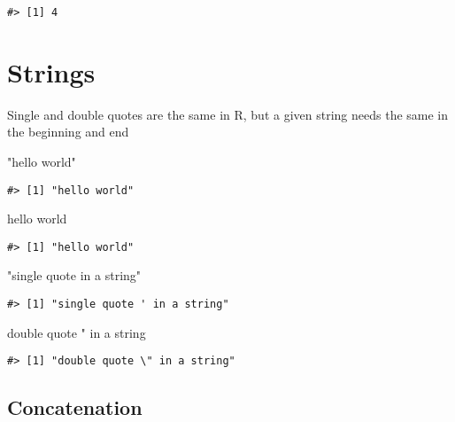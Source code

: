 \documentclass[
]{book}
\newenvironment{Shaded}{\begin{snugshade}}{\end{snugshade}}
\newcommand{\StringTok}[1]{\textcolor[rgb]{0.31,0.60,0.02}{#1}}
\begin{document}
\begin{verbatim}
#> [1] 4
\end{verbatim}

\hypertarget{strings-1}{%
\section{Strings}\label{strings-1}}

Single and double quotes are the same in R, but a given string needs the same in the beginning and end

\begin{Shaded}
\begin{Highlighting}[]
\StringTok{"hello world"}
\end{Highlighting}
\end{Shaded}

\begin{verbatim}
#> [1] "hello world"
\end{verbatim}

\begin{Shaded}
\begin{Highlighting}[]
\StringTok{\textquotesingle{}hello world\textquotesingle{}}
\end{Highlighting}
\end{Shaded}

\begin{verbatim}
#> [1] "hello world"
\end{verbatim}

\begin{Shaded}
\begin{Highlighting}[]
\StringTok{"single quote \textquotesingle{} in a string"}
\end{Highlighting}
\end{Shaded}

\begin{verbatim}
#> [1] "single quote ' in a string"
\end{verbatim}

\begin{Shaded}
\begin{Highlighting}[]
\StringTok{\textquotesingle{}double quote " in a string\textquotesingle{}}
\end{Highlighting}
\end{Shaded}

\begin{verbatim}
#> [1] "double quote \" in a string"
\end{verbatim}

\hypertarget{concatenation-1}{%
\subsection{Concatenation}\label{concatenation-1}}
\end{document}
